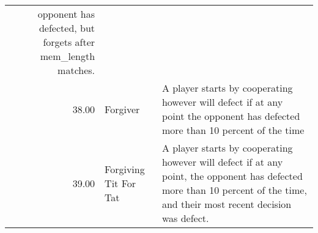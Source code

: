 \begin{table}[!hbtp]
\begin{adjustbox}{width=2\textwidth, angle=90}
\begin{tabular}{rll}
	opponent has defected, but forgets after mem\_length matches.                                                                                                                                                                                                                                                                                                                                                                                                                                                                                                                                                                                                                                                                                                                                                                                                                                                                                  \\
	38.00  & Forgiver                    & A player starts by cooperating however will defect if at any point
	the opponent has defected more than 10 percent of the time                                                                                                                                                                                                                                                                                                                                                                                                                                                                                                                                                                                                                                                                                                                                                                                                                                                                                        \\
	39.00  & Forgiving Tit For Tat       & A player starts by cooperating however will defect if at any point,
	the opponent has defected more than 10 percent of the time,
	and their most recent decision was defect.                                                                                                                                                                                                                                                                                                                                                                                                                                                                                                                                                                                                                                                                                                                                                                                                                                       \\

\end{tabular}
\end{adjustbox}
\end{table}
